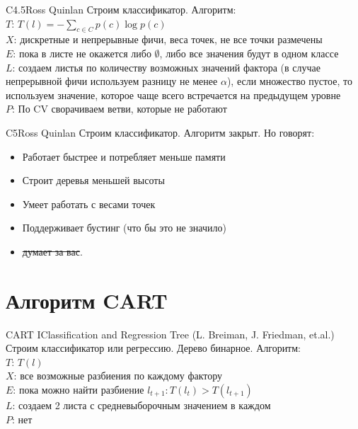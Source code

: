 \documentclass[14pt, fleqn, xcolor={dvipsnames, table}]{beamer}
\begin{document}
\begin{frame}{C4.5}{Ross Quinlan}
\small
Строим классификатор. Алгоритм:\\
{\color{blue}$T$:} $T(l) = -\sum_{c\in C} p(c) \log p(c)$\\
{\color{blue}$X$:} дискретные и непрерывные фичи, веса точек, не все точки размечены \\
{\color{blue}$E$:} пока в листе не окажется либо $\emptyset$, либо все значения будут в одном классе \\
{\color{blue}$L$:} создаем листья по количеству возможных значений фактора (в случае непрерывной фичи используем разницу не менее $\alpha$), если множество пустое, то используем значение, которое чаще всего встречается на предыдущем уровне\\
{\color{blue}$P$:} По CV сворачиваем ветви, которые не работают
\end{frame}

\begin{frame}{C5}{Ross Quinlan}
\small
Строим классификатор. Алгоритм закрыт. Но говорят:\\
\begin{itemize}
  \item Работает быстрее и потребляет меньше памяти
  \item Строит деревья меньшей высоты
  \item Умеет работать с весами точек
  \item Поддерживает бустинг (что бы это не значило)
  \item \sout{думает за вас}.
\end{itemize}
\end{frame}

\section{Алгоритм CART}

\begin{frame}{CART I}{Classification and Regression Tree (L. Breiman, J. Friedman, et.al.)}
\small
Строим классификатор или регрессию. Дерево бинарное. Алгоритм:\\
{\color{blue}$T$:} \footnotesize $T(l)$ \\\small
{\color{blue}$X$:} все возможные разбиения по каждому фактору \\
{\color{blue}$E$:} пока можно найти разбиение $l_{t+1}: T(l_t) > T(l_{t+1})$\\
{\color{blue}$L$:} создаем 2 листа с средневыборочным значением в каждом \\
{\color{blue}$P$:} нет
\end{frame}
\end{document}
